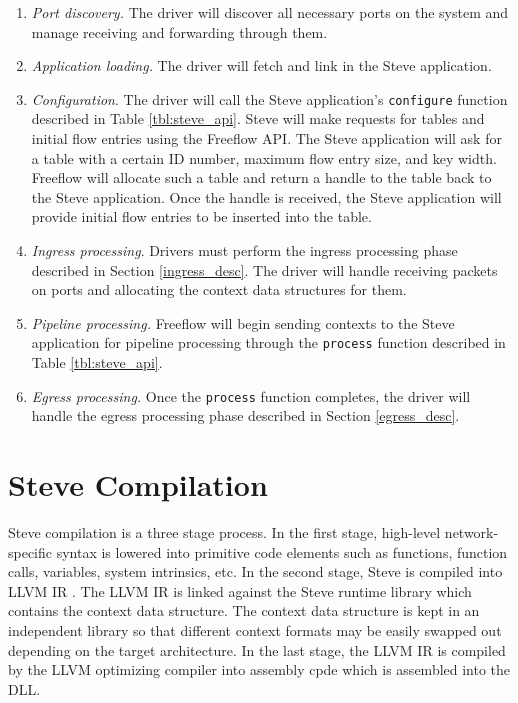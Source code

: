 \begin{enumerate}
\item \textit{Port discovery.} The driver will discover all necessary ports on the system and manage receiving and forwarding through them.

\item \textit{Application loading.} The driver will fetch and link in the Steve application.

\item \textit{Configuration}. The driver will call the Steve application's \texttt{configure} function described in Table \ref{tbl:steve_api}. Steve will make requests for tables and initial flow entries using the Freeflow API. The Steve application will ask for a table with a certain ID number, maximum flow entry size, and key width. Freeflow will allocate such a table and return a handle to the table back to the Steve application. Once the handle is received, the Steve application will provide initial flow entries to be inserted into the table.

\item \textit{Ingress processing}. Drivers must perform the ingress processing phase described in Section \ref{ingress_desc}. The driver will handle receiving packets on ports and allocating the context data structures for them.

\item \textit{Pipeline processing.} Freeflow will begin sending contexts to the Steve application for pipeline processing through the \texttt{process} function described in Table \ref{tbl:steve_api}.

\item \textit{Egress processing.} Once the \texttt{process} function completes, the driver will handle the egress processing phase described in Section \ref{egress_desc}.
\end{enumerate}

\section{Steve Compilation} \label{compile}

Steve compilation is a three stage process.
In the first stage, high-level network-specific syntax is lowered into primitive code elements such as functions, function calls, variables, system intrinsics, etc.
In the second stage, Steve is compiled into LLVM IR \cite{llvm_webpage}. The LLVM IR is linked against the Steve runtime library which contains the context data structure. The context data structure is kept in an independent library so that different context formats may be easily swapped out depending on the target architecture.
In the last stage, the LLVM IR is compiled by the LLVM optimizing compiler into assembly cpde which is assembled into the DLL.